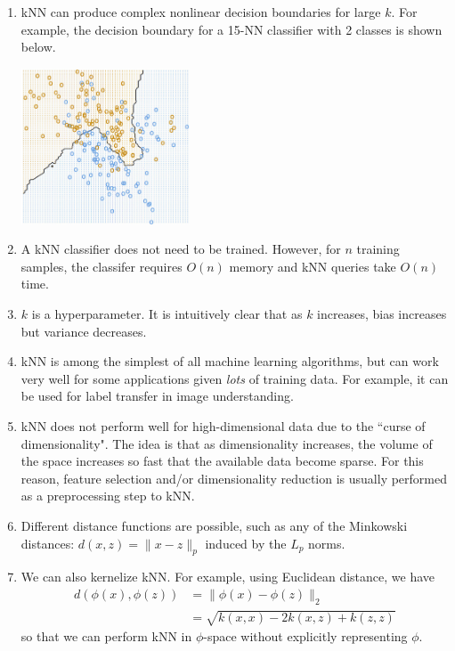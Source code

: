 \documentclass[10pt]{article}
\begin{document}
\begin{multicols}{2}
\begin{addmargin}[0.8em]{0.5em}
\begin{enumerate}[label=(\alph*)]
        \item kNN can produce complex nonlinear decision boundaries for large $k$. For example, the decision boundary for a 15-NN classifier with 2 classes is shown below.
        \begin{center}
            \includegraphics[width=5cm]{knn2.png}
        \end{center}
        
        \item A kNN classifier does not need to be trained. However, for $n$ training samples, the classifer requires $O(n)$ memory and kNN queries take $O(n)$ time.
        
        \item $k$ is a hyperparameter. It is intuitively clear that as $k$ increases, bias increases but variance decreases.
        
        \item kNN is among the simplest of all machine learning algorithms, but can work very well for some applications given \textit{lots} of training data. For example, it can be used for label transfer in image understanding.
        
        \item kNN does not perform well for high-dimensional data due to the ``curse of dimensionality". The idea is that as dimensionality increases, the volume of the space increases so fast that the available data become sparse. For this reason, feature selection and/or dimensionality reduction is usually performed as a preprocessing step to kNN.
        
        \item Different distance functions are possible, such as any of the Minkowski distances: $d(x,z) = \| x - z \|_p$ induced by the $L_p$ norms.
        
        \item We can also kernelize kNN. For example, using Euclidean distance, we have
        \begin{align*}
            d(\phi(x), \phi(z)) &= \|\phi(x) - \phi(z)\|_2 \\
            &= \sqrt{k(x,x)-2k(x,z)+k(z,z)}
        \end{align*}
        so that we can perform kNN in $\phi$-space without explicitly representing $\phi$.
    \end{enumerate} 
    

\end{addmargin}
\end{multicols}
\end{document}
